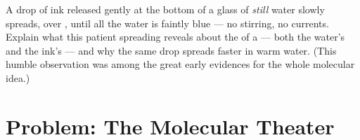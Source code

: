 \begin{exercise}[$\star\star\star$]\label{exo:g7:states-of-matter:12}
A drop of ink released gently at the bottom of a glass of
\emph{still} water slowly spreads, over , until all the
water is faintly blue --- no stirring, no currents. Explain what
this patient spreading reveals about the  of a 
--- both the water's and the ink's --- and why the same drop
spreads faster in warm water. (This humble observation was among
the great early evidences for the whole molecular idea.)
\end{exercise}

\section{Problem: The Molecular Theater}

